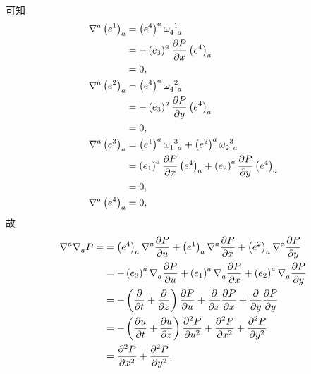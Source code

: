 \begin{xiti}
\begin{zm}
\begin{align*}
		\end{align*}
		可知
		\begin{equation*}
			\begin{split}
				\tensor{\nabla}{^a} \tensor{\left( e^1 \right)}{_a} &= \tensor{\left( e^4 \right)}{^a} \tensor{\omega}{_4^1_a}\\
				&= - \tensor{\left( e_3 \right)}{^a} \pdv{P}{x} \tensor{\left( e^4 \right)}{_a}\\
				&= 0,\\
				\tensor{\nabla}{^a} \tensor{\left( e^2 \right)}{_a} &= \tensor{\left( e^4 \right)}{^a} \tensor{\omega}{_4^2_a}\\
				&= - \tensor{\left( e_3 \right)}{^a} \pdv{P}{y} \tensor{\left( e^4 \right)}{_a}\\
				&= 0,\\
				\tensor{\nabla}{^a} \tensor{\left( e^3 \right)}{_a} &= \tensor{\left( e^1 \right)}{^a} \tensor{\omega}{_1^3_a} + \tensor{\left( e^2 \right)}{^a} \tensor{\omega}{_2^3_a}\\
				&= \tensor{\left( e_1 \right)}{^a} \pdv{P}{x} \tensor{\left( e^4 \right)}{_a} + \tensor{\left( e_2 \right)}{^a} \pdv{P}{y} \tensor{\left( e^4 \right)}{_a}\\
				&= 0,\\
				\tensor{\nabla}{^a} \tensor{\left( e^4 \right)}{_a} &= 0,
			\end{split}
		\end{equation*}
		故
		\begin{align*}
			\tensor{\nabla}{^a} \tensor{\nabla}{_a} P =&= \tensor{\left( e^4 \right)}{_a} \tensor{\nabla}{^a} \pdv{P}{u} + \tensor{\left( e^1 \right)}{_a} \tensor{\nabla}{^a} \pdv{P}{x} + \tensor{\left( e^2 \right)}{_a} \tensor{\nabla}{^a} \pdv{P}{y}\\
			&= - \tensor{\left( e_3 \right)}{^a} \tensor{\nabla}{_a} \pdv{P}{u} + \tensor{\left( e_1 \right)}{^a} \tensor{\nabla}{_a} \pdv{P}{x} + \tensor{\left( e_2 \right)}{^a} \tensor{\nabla}{_a} \pdv{P}{y}\\
			&= - \left( \pdv{t} + \pdv{z} \right) \pdv{P}{u} + \pdv{x} \pdv{P}{x} + \pdv{y} \pdv{P}{y}\\
			&= - \left( \pdv{u}{t} + \pdv{u}{z} \right) \pdv[2]{P}{u} + \pdv[2]{P}{x} + \pdv[2]{P}{y}\\
			&= \pdv[2]{P}{x} + \pdv[2]{P}{y}.
		\end{align*}
	\end{zm}
\end{xiti}
